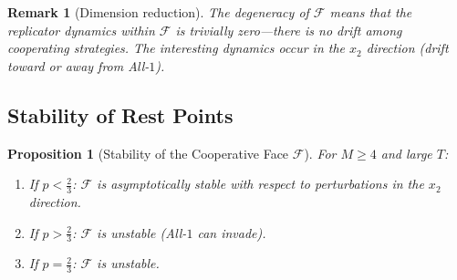 \documentclass[12pt,a4paper]{article}
\newtheorem{proposition}{Proposition}[section]
\newtheorem{remark}{Remark}[section]
\begin{document}
\begin{remark}[Dimension reduction]\label{rem:dimred}
The degeneracy of $\mathcal{F}$ means that the replicator dynamics
\emph{within} $\mathcal{F}$ is trivially zero---there is no drift among
cooperating strategies.  The interesting dynamics occur in the $x_2$ direction
(drift toward or away from All-$1$).
\end{remark}

\subsection{Stability of Rest Points}

\begin{proposition}[Stability of the Cooperative Face $\mathcal{F}$]
\label{prop:stabF}
For $M\geq 4$ and large $T$:
\begin{enumerate}
  \item If $p<\tfrac{2}{3}$: $\mathcal{F}$ is asymptotically stable with
        respect to perturbations in the $x_2$ direction.
  \item If $p>\tfrac{2}{3}$: $\mathcal{F}$ is unstable (All-$1$ can invade).
  \item If $p=\tfrac{2}{3}$: $\mathcal{F}$ is unstable.
\end{enumerate}
\end{proposition}
\end{document}
